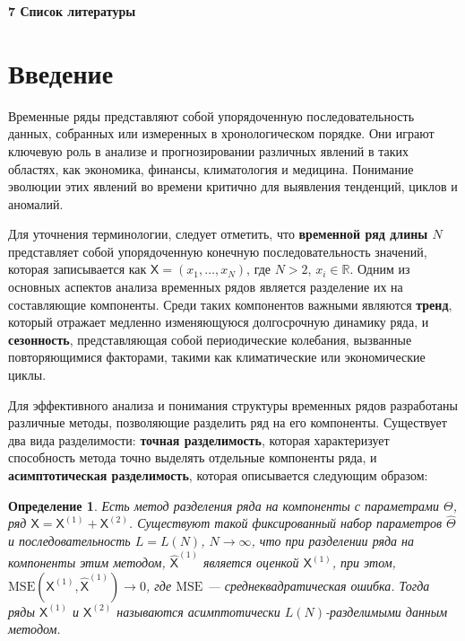 \documentclass[a4paper, 11pt]{article}
\date{}
\newcommand{\TS}{\mathsf{X}}
\newtheorem{definition}{Определение} %
\begin{document}
%


\tableofcontents
\noindent
\textbf{7\textit{} \space Список литературы}

\newpage

\section{Введение}


Временные ряды представляют собой упорядоченную последовательность данных, собранных или измеренных в хронологическом порядке. Они играют ключевую роль в анализе и прогнозировании различных явлений в таких областях, как экономика, финансы, климатология и медицина. Понимание эволюции этих явлений во времени критично для выявления тенденций, циклов и аномалий.

Для уточнения терминологии, следует отметить, что \textbf{временной ряд длины \( N \)} представляет собой упорядоченную конечную последовательность значений, которая записывается как \( \TS = (x_1, \dots, x_{N}) \), где \( N > 2 \), $x_i \in \mathbb{R}$. Одним из основных аспектов анализа временных рядов является разделение их на составляющие компоненты. Среди таких компонентов важными являются \textbf{тренд}, который отражает медленно изменяющуюся долгосрочную динамику ряда, и \textbf{сезонность}, представляющая собой периодические колебания, вызванные повторяющимися факторами, такими как климатические или экономические циклы.

Для эффективного анализа и понимания структуры временных рядов разработаны различные методы, позволяющие разделить ряд на его компоненты. Существует два вида разделимости: \textbf{точная разделимость}, которая характеризует способность метода точно выделять отдельные компоненты ряда, и \textbf{асимптотическая разделимость}, которая описывается следующим образом:

\begin{definition}
	\label{def:asymp}
	Есть метод разделения ряда на компоненты с параметрами \( \Theta \), ряд \( \TS = \TS^{(1)} + \TS^{(2)} \). Существуют такой фиксированный набор параметров \( \hat{\Theta} \) и последовательность \( L = L(N) \), \( N \rightarrow \infty \), что при разделении ряда на компоненты этим методом, \( \hat{\TS}^{(1)} \) является оценкой \( \TS^{(1)} \), при этом, \( \mathrm{MSE}\left(\TS^{(1)}, \hat{\TS}^{(1)}\right) \rightarrow 0 \), где \( \mathrm{MSE} \) --- среднеквадратическая ошибка. Тогда ряды \( \TS^{(1)} \) и \( \TS^{(2)} \) называются асимптотически \( L(N) \)-разделимыми данным методом.
\end{definition}
\end{document}
